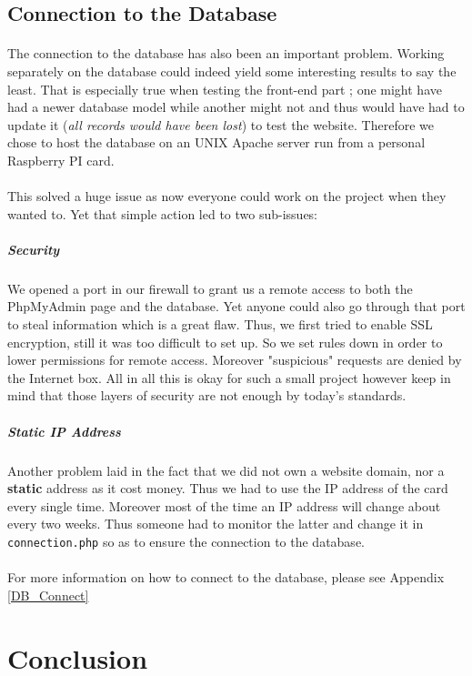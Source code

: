 \documentclass[11pt,a4paper,titlepage]{article}
\begin{document}
\subsection{Connection to the Database}
\paragraph{}
The connection to the database has also been an important problem. Working separately on the database could indeed yield some interesting results to say the least. That is especially true when testing the front-end part ; one might have had a newer database model while another might not and thus would have had to update it (\textit{all records would have been lost}) to test the website. Therefore we chose to host the database on an UNIX Apache server run from a personal Raspberry PI card.
\paragraph{}
This solved a huge issue as now everyone could work on the project when they wanted to. Yet that simple action led to two sub-issues:
\subparagraph{Security}
We opened a port in our firewall to grant us a remote access to both the PhpMyAdmin page and the database. Yet anyone could also go through that port to steal information which is a great flaw. Thus, we first tried to enable SSL encryption, still it was too difficult to set up. So we set rules down in order to lower permissions for remote access. Moreover "suspicious" requests are denied by the Internet box. All in all this is okay for such a small project however keep in mind that those layers of security are not enough by today's standards.
\subparagraph{Static IP Address}
Another problem laid in the fact that we did not own a website domain, nor a \textbf{static} address as it cost money. Thus we had to use the IP address of the card every single time. Moreover most of the time an IP address will change about every two weeks. Thus someone had to monitor the latter and change it in \verb|connection.php| so as to ensure the connection to the database. 
\paragraph{}
For more information on how to connect to the database, please see Appendix \ref{DB_Connect}

\newpage
\section{Conclusion}
\end{document}
